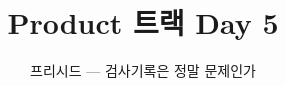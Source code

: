 \documentclass[aspectratio=169,11pt,t]{beamer}
\title{Product 트랙 Day 5}
\subtitle{프리시드 — 검사기록은 정말 문제인가}
\begin{document}
\begin{frame}[plain,c]
\titlepage
\end{frame}

\end{document}
